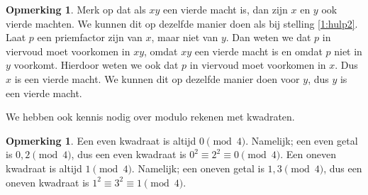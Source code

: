 \documentclass[12pt,reqno]{article}
\theoremstyle{theorem}
\theoremstyle{definition}
\newtheorem{remark}[theorem]{Opmerking}
\begin{document}
	\begin{remark}\label{1:hulp4}
		Merk op dat als $xy$ een vierde macht is, dan zijn $x$ en $y$ ook vierde machten. We kunnen dit op dezelfde manier doen als bij stelling \ref{1:hulp2}. Laat $p$ een priemfactor zijn van $x$, maar niet van $y$. Dan weten we dat $p$ in viervoud moet voorkomen in $xy$, omdat $xy$ een vierde macht is en omdat $p$ niet in $y$ voorkomt. Hierdoor weten we ook dat $p$ in viervoud moet voorkomen in $x$. Dus $x$ is een vierde macht. We kunnen dit op dezelfde manier doen voor $y$, dus $y$ is een vierde macht.
	\end{remark}
					
	We hebben ook kennis nodig over modulo rekenen met kwadraten.
					
	\begin{remark}\label{1:hulpMod}
		Een even kwadraat is altijd $0 \pmod{4}$. Namelijk; een even getal is $0,2 \pmod{4}$, dus een even kwadraat is $0^2 \equiv 2^2 \equiv 0 \pmod{4}$. Een oneven kwadraat is altijd $1 \pmod{4}$. Namelijk; een oneven getal is $1,3 \pmod{4}$, dus een oneven kwadraat is $1^2 \equiv 3^2 \equiv 1 \pmod{4}$.
	\end{remark}
						
\end{document}
